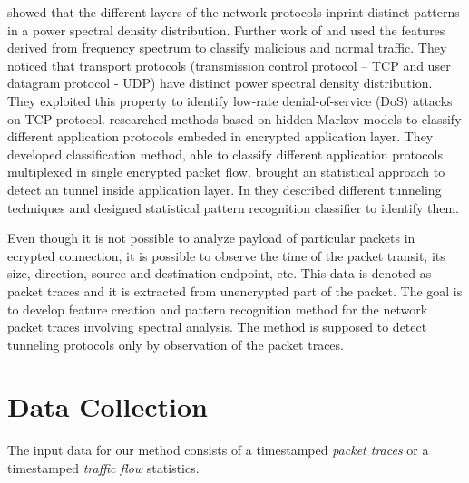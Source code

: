  \cite{he2004spectral} showed that the different layers of the network
protocols inprint distinct patterns in a power spectral density distribution. 
Further work of  and  \cite{chen2007spectral}
used the features derived %
from frequency spectrum to classify malicious and normal traffic.
They noticed that transport protocols (transmission control protocol --
TCP and user datagram protocol - UDP) 
have distinct power spectral density distribution. 
They exploited this property to identify low-rate denial-of-service (DoS)
attacks on TCP protocol. %
 \cite{wright2006inferring} researched methods based on 
hidden Markov models to classify different application protocols embeded in 
encrypted application layer.
They developed classification method, able to classify different 
application protocols multiplexed in single encrypted packet flow.
 brought an statistical approach 
to detect an tunnel inside application layer.
In  \cite{dusi2009tunnel}  they described different tunneling techniques and designed 
statistical pattern recognition classifier to identify them.

Even though it is not possible to analyze payload of particular packets in 
ecrypted connection, it is possible to observe the time of the packet transit, 
its size, direction, source and destination endpoint, etc. 
This data is denoted as packet traces and it is extracted from unencrypted 
part of the packet. 
The goal is to develop feature creation and pattern recognition method for 
the network packet traces involving spectral analysis.
The method is supposed to detect tunneling protocols only by observation 
of the packet traces.

\section{Data Collection}

The input data for our method consists of a timestamped \emph{packet traces} or a
timestamped \emph{traffic flow} statistics. 

